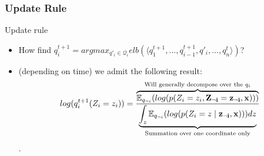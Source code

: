\documentclass{beamer}
\begin{document}
\begin{frame}
  \frametitle{Update Rule}
  \begin{alertblock}{Update rule}
    \begin{itemize}
    \item How find $q^{t+1}_{i} = argmax_{q'_i \in \mathcal{Q}_i} elb(\langle q^{t+1}_1, \dots, q^{t+1}_{i-1}, q'_i,\dots, q^{t}_n  \rangle)$?
    \item (depending on time) we admit the following result:
      \[ log(q^{t+1}_{i}(Z_i = z_i)) = \frac{\overbrace{\mathbb{E}_{q_{\neg i}}(log(p(Z_i = z_i, {\bf Z_{\neg i}} = {\bf z_{\neg i}}, {\bf x} )))}^{\textnormal{Will generally decompose over the $q_i$}}}{\underbrace{\int_{z} \mathbb{E}_{q_{\neg i}}(log(p(Z_i = z \mid {\bf z_{\neg i}}, {\bf x} )))dz  }_{\textnormal{Summation over one coordinate only}}} \].
   
    \end{itemize}
  \end{alertblock}
\end{frame}
\end{document}
